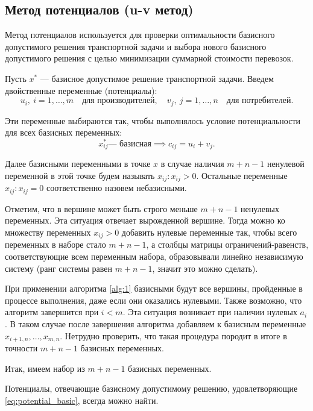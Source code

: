 \documentclass[12pt]{article}
\theoremstyle{definition}
\theoremstyle{plain}
\theoremstyle{definition}
\begin{document}
\subsection{Метод потенциалов (u-v метод)}

Метод потенциалов\cite{conf3} используется для проверки оптимальности базисного
допустимого решения транспортной задачи и выбора нового базисного допустимого решения
с целью минимизации суммарной стоимости перевозок.

Пусть $x^*$ — базисное допустимое решение транспортной задачи.
Введем двойственные переменные (потенциалы):
\[
u_i, \: i = 1,\dots,m \quad \text{для производителей}, 
\quad
v_j, \: j = 1,\dots,n \quad \text{для потребителей}.
\]



Эти переменные выбираются так, чтобы выполнялось условие потенциальности для
всех базисных переменных:
\begin{equation}
x^*_{ij} \text{--- базисная} \implies c_{ij} = u_i + v_j.
\label{eq:potential_basic}
\end{equation}

Далее базисными переменными в точке $x$ в случае наличия $m + n - 1$ ненулевой переменной
в этой точке будем называть $x_{ij}: x_{ij} > 0$.
Остальные переменные $x_{ij}: x_{ij} = 0$ соответственно назовем небазисными.

Отметим, что в вершине может быть строго меньше $m + n - 1$ ненулевых переменных.
Эта ситуация отвечает вырожденной вершине.
Тогда можно ко множеству переменных $x_{ij} > 0$ добавить нулевые переменные так,
чтобы всего переменных в наборе стало $m + n - 1$, 
а столбцы матрицы ограничений-равенств, соответствующие всем переменным набора,
образовывали линейно независимую систему (ранг системы равен $m + n - 1$, значит это можно сделать).

При применении алгоритма \ref{alg:1} базисными будут все вершины,
пройденные в процессе выполнения, даже если они оказались нулевыми.
Также возможно, что алгоритм завершится при $i < m$. Эта ситуация возникает при наличии
нулевых $a_i$. В таком случае после завершения алгоритма добавляем к базисным переменные
$x_{i+1,n},\dots,x_{m,n}$. Нетрудно проверить, что такая процедура породит в итоге в точности
$m + n - 1$ базисных переменных.

Итак, имеем набор из $m + n - 1$ базисных переменных.

\begin{assertionlocal}\label{assert:finding_potentials}
Потенциалы, отвечающие базисному допустимому решению, удовлетворяющие
\eqref{eq:potential_basic}, всегда можно найти.
\end{assertionlocal}
\end{document}
